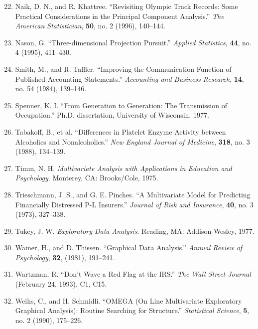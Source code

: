 
\begin{enumerate}
\setcounter{enumi}{21}
\item Naik, D. N., and R. Khattree. ``Revisiting Olympic Track Records: Some Practical Considerations in the Principal Component Analysis.'' \textit{The American Statistician}, \textbf{50}, no. 2 (1996), 140--144.

\item Nason, G. ``Three-dimensional Projection Pursuit.'' \textit{Applied Statistics}, \textbf{44}, no. 4 (1995), 411--430.

\item Smith, M., and R. Taffler. ``Improving the Communication Function of Published Accounting Statements.'' \textit{Accounting and Business Research}, \textbf{14}, no. 54 (1984), 139--146.

\item Spenner, K. I. ``From Generation to Generation: The Transmission of Occupation.'' Ph.D. dissertation, University of Wisconsin, 1977.

\item Tabakoff, B., et al. ``Differences in Platelet Enzyme Activity between Alcoholics and Nonalcoholics.'' \textit{New England Journal of Medicine}, \textbf{318}, no. 3 (1988), 134--139.

\item Timm, N. H. \textit{Multivariate Analysis with Applications in Education and Psychology}. Monterey, CA: Brooks/Cole, 1975.

\item Trieschmann, J. S., and G. E. Pinches. ``A Multivariate Model for Predicting Financially Distressed P-L Insurers.'' \textit{Journal of Risk and Insurance}, \textbf{40}, no. 3 (1973), 327--338.

\item Tukey, J. W. \textit{Exploratory Data Analysis}. Reading, MA: Addison-Wesley, 1977.

\item Wainer, H., and D. Thissen. ``Graphical Data Analysis.'' \textit{Annual Review of Psychology}, \textbf{32}, (1981), 191--241.

\item Wartzman, R. ``Don't Wave a Red Flag at the IRS.'' \textit{The Wall Street Journal} (February 24, 1993), C1, C15.

\item Weihs, C., and H. Schmidli. ``OMEGA (On Line Multivariate Exploratory Graphical Analysis): Routine Searching for Structure.'' \textit{Statistical Science}, \textbf{5}, no. 2 (1990), 175--226.
\end{enumerate}
